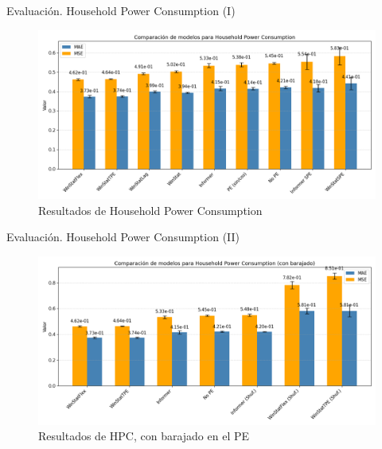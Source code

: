 \documentclass[compress]{beamer}
\begin{document}
	\subsection{}
	\begin{frame}{Evaluación. Household Power Consumption (I)}	
		\begin{figure}
			\includegraphics[width=\linewidth]{pic/hpcgraph.png}
			\caption{Resultados de Household Power Consumption}
		\end{figure}
	\end{frame}
	
		\begin{frame}{Evaluación. Household Power Consumption (II)}	
		\begin{figure}
			\includegraphics[width=\linewidth]{pic/hpcgraphshuffled.png}
			\caption{Resultados de HPC, con barajado en el PE}
		\end{figure}
	\end{frame}
	
\end{document}
